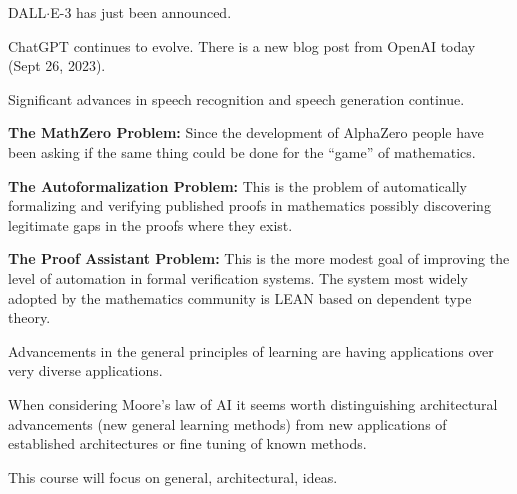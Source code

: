 {{

DALL$\cdot$E-3 has just been announced.

\vfill
ChatGPT continues to evolve. There is a new blog post from OpenAI today (Sept 26, 2023).

\vfill
Significant advances in speech recognition and speech generation continue.


{\bf The MathZero Problem:} Since the development of AlphaZero people have been asking if the same thing could be done for the ``game'' of mathematics.

\vfill
{\bf The Autoformalization Problem:} This is the problem of automatically formalizing and verifying published proofs in mathematics possibly discovering legitimate gaps in the proofs where they exist.

\vfill
{\bf The Proof Assistant Problem:} This is the more modest goal of improving the level of automation in formal verification systems.  The system
most widely adopted by the mathematics community is LEAN based on dependent type theory.


Advancements in the general principles of learning are having applications over very diverse applications.

\vfill
When considering Moore's law of AI it seems worth distinguishing architectural advancements (new general learning methods)
from new applications of established architectures or fine tuning of known methods.

\vfill
This course will focus on general, architectural, ideas.


}}
